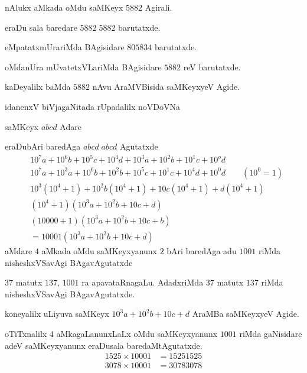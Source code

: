 nAlukx aMkada oMdu saMKeyx $5882$ Agirali.

eraDu sala baredare $5882\; 5882$ barutatxde.

eMpatatxmUrariMda BAgisidare $805834$ barutatxde.

oMdanUra mUvatetxVLariMda BAgisidare $5882$ reV barutatxde.

kaDeyalilx baMda $5882$ nAvu AraMVBisida saMKeyxyeV Agide.

idanenxV biVjagaNitada rUpadalilx noVDoVNa

saMKeyx $abcd$ Adare

eraDubAri baredAga $abcd\;abcd$ Agutatxde
{\fontsize{10}{12}\selectfont
\begin{align*}
& 10^{7}a + 10^{6}b +10^{5}c +10^{4}d + 10^{3}a + 10^{2}b +10^{1}c +10^{o}d\\
& 10^{7}a +10^{3}a +10^{6}b +10^{2}b + 10^{5}c +10^{1}c + 10^{4}d +10^{0}d \qquad\text{$\left(10^0 =1\right)$}\\
& 10^3\left(10^4 +1\right) +10^{2}b\left(10^4 +1\right) + 10c\left(10^4 +1\right) +d \left(10^4+ 1\right)\\
&\left(10^4 +1\right) \left(10^{3}a + 10^{2}b +10c + d\right)\\
&(10000+1)\left(10^{3}a + 10^{2}b+10c+b\right)\\
&=10001\left(10^{3}a + 10^{2}b +10c +d\right)
 \end{align*}
 }
aMdare $4$ aMkada oMdu saMKeyxyanunx $2$ bAri baredAga adu $1001$ riMda nisheshxVSavAgi BAgavAgutatxde

$37$ matutx $137$, $1001$ ra apavataRnagaLu. AdadxriMda $37$ matutx $137$ riMda nisheshxVSavAgi BAgavAgutatxde.

koneyalilx uLiyuva saMKeyx $10^{3}a+10^{2}b+10c+d$ AraMBa saMKeyxyeV Agide.

\vfill\eject
oTiTxnalilx $4$ aMkagaLanunxLaLx oMdu saMKeyxyanunx $1001$ riMda gaNisidare adeV saMKeyx\-yanunx eraDusala baredaMtAgutatxde. 
\begin{align*}
1525\times 10001 &= 15251525\\
3078 \times 10001 &= 30783078
\end{align*}
